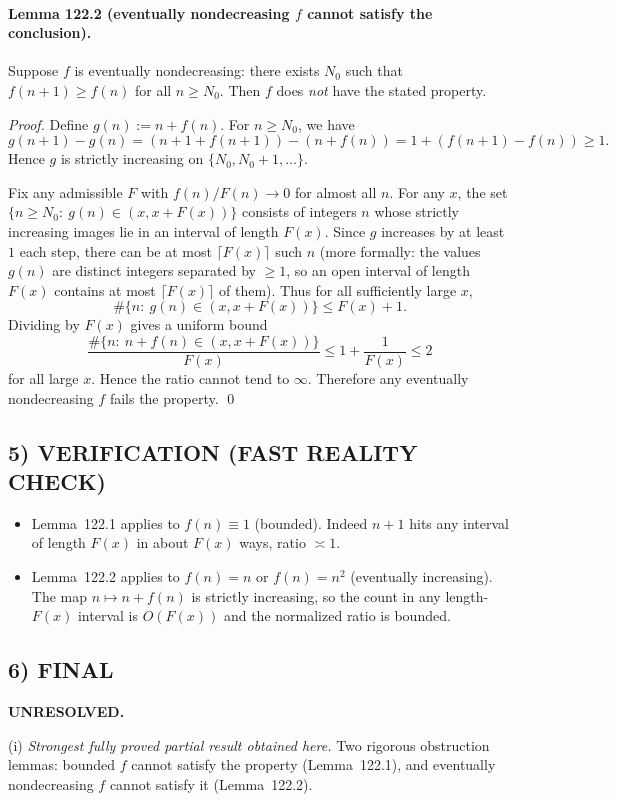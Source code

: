 \paragraph{Lemma 122.2 (eventually nondecreasing $f$ cannot satisfy the conclusion).}
Suppose $f$ is eventually nondecreasing: there exists $N_0$ such that $f(n+1)\ge f(n)$ for all $n\ge N_0$.  Then $f$ does \emph{not} have the stated property.

\emph{Proof.}
Define $g(n):=n+f(n)$.  For $n\ge N_0$, we have
\[
 g(n+1)-g(n)=(n+1+f(n+1))-(n+f(n))=1+(f(n+1)-f(n))\ge 1.
\]
Hence $g$ is strictly increasing on $\{N_0,N_0+1,\dots\}$.

Fix any admissible $F$ with $f(n)/F(n)\to0$ for almost all $n$.  For any $x$, the set
\(
\{n\ge N_0:\ g(n)\in(x,x+F(x))\}
\)
consists of integers $n$ whose strictly increasing images lie in an interval of length $F(x)$.  Since $g$ increases by at least $1$ each step, there can be at most $\lceil F(x)\rceil$ such $n$ (more formally: the values $g(n)$ are distinct integers separated by $\ge1$, so an open interval of length $F(x)$ contains at most $\lceil F(x)\rceil$ of them).
Thus for all sufficiently large $x$,
\[
\#\{n:\ g(n)\in(x,x+F(x))\}\le F(x)+1.
\]
Dividing by $F(x)$ gives a uniform bound
\[
\frac{\#\{n:\ n+f(n)\in(x,x+F(x))\}}{F(x)}\le 1+\frac{1}{F(x)}\le 2
\]
for all large $x$.  Hence the ratio cannot tend to $\infty$.
Therefore any eventually nondecreasing $f$ fails the property. \qed

\subsection*{5) VERIFICATION (FAST REALITY CHECK)}
\begin{itemize}
\item Lemma~122.1 applies to $f(n)\equiv 1$ (bounded).  Indeed $n+1$ hits any interval of length $F(x)$ in about $F(x)$ ways, ratio $\asymp 1$.
\item Lemma~122.2 applies to $f(n)=n$ or $f(n)=n^2$ (eventually increasing).  The map $n\mapsto n+f(n)$ is strictly increasing, so the count in any length-$F(x)$ interval is $O(F(x))$ and the normalized ratio is bounded.
\end{itemize}

\subsection*{6) FINAL}
\textbf{UNRESOLVED.}

(i) \emph{Strongest fully proved partial result obtained here.}
Two rigorous obstruction lemmas: bounded $f$ cannot satisfy the property (Lemma~122.1), and eventually nondecreasing $f$ cannot satisfy it (Lemma~122.2).

